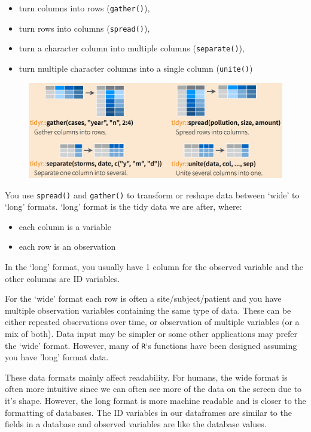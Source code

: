 \documentclass[]{book}
\providecommand{\tightlist}{%
  \setlength{\itemsep}{0pt}\setlength{\parskip}{0pt}}
\theoremstyle{definition}
\theoremstyle{definition}
\theoremstyle{definition}
\theoremstyle{remark}
\begin{document}
\begin{itemize}
\tightlist
\item
  turn columns into rows (\texttt{gather()}),
\item
  turn rows into columns (\texttt{spread()}),
\item
  turn a character column into multiple columns (\texttt{separate()}),
\item
  turn multiple character columns into a single column
  (\texttt{unite()})
\end{itemize}

\begin{figure}[htbp]
\centering
\includegraphics{img/rstudio-cheatsheet-spread-gather-sep-unite.png}
\caption{}
\end{figure}

You use \texttt{spread()} and \texttt{gather()} to transform or reshape
data between `wide' to `long' formats. `long' format is the tidy data we
are after, where:

\begin{itemize}
\tightlist
\item
  each column is a variable
\item
  each row is an observation
\end{itemize}

In the `long' format, you usually have 1 column for the observed
variable and the other columns are ID variables.

For the `wide' format each row is often a site/subject/patient and you
have multiple observation variables containing the same type of data.
These can be either repeated observations over time, or observation of
multiple variables (or a mix of both). Data input may be simpler or some
other applications may prefer the `wide' format. However, many of
\texttt{R}`s functions have been designed assuming you have 'long'
format data.

These data formats mainly affect readability. For humans, the wide
format is often more intuitive since we can often see more of the data
on the screen due to it's shape. However, the long format is more
machine readable and is closer to the formatting of databases. The ID
variables in our dataframes are similar to the fields in a database and
observed variables are like the database values.
\end{document}
